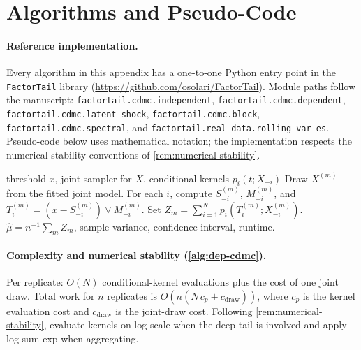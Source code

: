 \section{Algorithms and Pseudo-Code}
\label{appx:algorithms}

\paragraph{Reference implementation.}
Every algorithm in this appendix has a one-to-one Python entry point in the
\texttt{FactorTail} library
(\url{https://github.com/osolari/FactorTail}). Module paths follow the
manuscript: \texttt{factortail.cdmc.independent}, \texttt{factortail.cdmc.dependent},
\texttt{factortail.cdmc.latent\_shock}, \texttt{factortail.cdmc.block},
\texttt{factortail.cdmc.spectral}, and \texttt{factortail.real\_data.rolling\_var\_es}.
Pseudo-code below uses mathematical notation; the implementation respects the
numerical-stability conventions of \cref{rem:numerical-stability}.

\begin{algorithm}[H]
\caption{Dependent selected-maximum CdMC}
\label{alg:dep-cdmc}
\begin{algorithmic}[1]
\Require threshold \(x\), joint sampler for \(X\), conditional kernels \(p_i(t;X_{-i})\)
  \State Draw \(X^{(m)}\) from the fitted joint model.
  \State For each \(i\), compute \(S_{-i}^{(m)}\), \(M_{-i}^{(m)}\), and \(T_i^{(m)}=(x-S_{-i}^{(m)})\vee M_{-i}^{(m)}\).
  \State Set \(Z_m=\sum_{i=1}^N p_i(T_i^{(m)};X_{-i}^{(m)})\).
\EndFor
\State \Return \(\widehat\mu=n^{-1}\sum_mZ_m\), sample variance, confidence interval, runtime.
\end{algorithmic}
\end{algorithm}

\paragraph{Complexity and numerical stability (\cref{alg:dep-cdmc}).}
Per replicate: $O(N)$ conditional-kernel evaluations plus the cost of one joint
draw. Total work for $n$ replicates is $O(n(N\,c_p+c_{\mathrm{draw}}))$, where
$c_p$ is the kernel evaluation cost and $c_{\mathrm{draw}}$ is the joint-draw
cost. Following \cref{rem:numerical-stability}, evaluate kernels on log-scale
when the deep tail is involved and apply log-sum-exp when aggregating.

